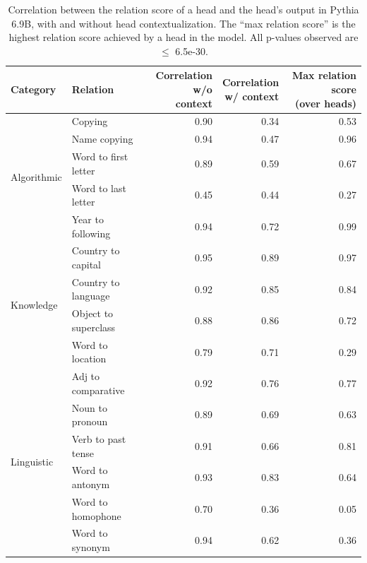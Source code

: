\documentclass[11pt]{article}
\newcommand{\PythiaSevenB}{Pythia 6.9B}
\begin{document}
\begin{table}[p]
\centering
\footnotesize

\begin{tabular}{llrrr}
\toprule
Category & Relation & \makecell{Correlation\\w/o context} & \makecell{Correlation\\w/ context} & \makecell{Max relation score\\(over heads)} \\
\midrule
\multirow{5}{*}{Algorithmic} & Copying & 0.90 &  0.34 & 0.53 \\
 & Name copying & 0.94 &  0.47  & 0.96 \\
 & Word to first letter & 0.89 &  0.59 & 0.67 \\
 & Word to last letter & 0.45  & 0.44 & 0.27 \\
 & Year to following & 0.94 &  0.72 & 0.99 \\
\midrule
\multirow{4}{*}{Knowledge} & Country to capital & 0.95 &  0.89 &  0.97 \\
 & Country to language & 0.92 &  0.85 & 0.84 \\
 & Object to superclass & 0.88 &  0.86 & 0.72 \\
 & Word to location & 0.79 & 0.71 & 0.29 \\
\midrule
\multirow{6}{*}{Linguistic} & Adj to comparative & 0.92 &  0.76 & 0.77 \\
 & Noun to pronoun & 0.89 &  0.69 & 0.63 \\
 & Verb to past tense & 0.91 &  0.66 & 0.81 \\
 & Word to antonym & 0.93 &  0.83 & 0.64 \\
 & Word to homophone & 0.70 & 0.36 & 0.05 \\
 & Word to synonym & 0.94 & 0.62 &  0.36 \\
\bottomrule
\end{tabular}

\caption{Correlation between the relation score of a head and the head's output in \PythiaSevenB{}, with and without head contextualization. The ``max relation score'' is the highest relation score achieved by a head in the model. All p-values observed are $\leq$ 6.5e-30.} 
\label{tab:Dynamic_results_pythia_7b}
\end{table}
\end{document}
